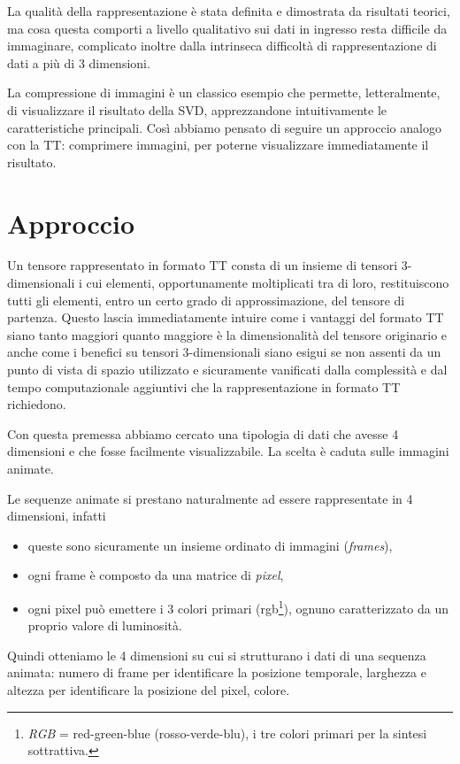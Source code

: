 \documentclass[11pt,a4paper]{article}
\begin{document}
  La qualità della rappresentazione è stata definita e dimostrata da risultati teorici, ma cosa questa comporti a livello qualitativo sui dati in ingresso resta difficile da immaginare, complicato inoltre dalla intrinseca difficoltà di rappresentazione di dati a più di 3 dimensioni.

  La compressione di immagini è un classico esempio che permette, letteralmente, di visualizzare il risultato della SVD, apprezzandone intuitivamente le caratteristiche principali. Così abbiamo pensato di seguire un approccio analogo con la TT: comprimere immagini, per poterne visualizzare immediatamente il risultato.

\section{Approccio}
Un tensore rappresentato in formato TT consta di un insieme di tensori 3-dimensionali i cui elementi, opportunamente moltiplicati tra di loro, restituiscono tutti gli elementi, entro un certo grado di approssimazione, del tensore di partenza.
Questo lascia immediatamente intuire come i vantaggi del formato TT siano tanto maggiori quanto maggiore è la dimensionalità del tensore originario e anche come i benefici su tensori 3-dimensionali siano esigui se non assenti da un punto di vista di spazio utilizzato e sicuramente vanificati dalla complessità e dal tempo computazionale aggiuntivi che la rappresentazione in formato TT richiedono.

Con questa premessa abbiamo cercato una tipologia di dati che avesse 4 dimensioni e che fosse facilmente visualizzabile. La scelta è caduta sulle immagini animate.

Le sequenze animate si prestano naturalmente ad essere rappresentate in 4 dimensioni, infatti
\begin{itemize}
\item queste sono sicuramente un insieme ordinato di immagini (\emph{frames}),
\item ogni frame è composto da una matrice di \emph{pixel},
\item ogni pixel può emettere i 3 colori primari (rgb\footnote{\emph{RGB} = red-green-blue (rosso-verde-blu), i tre colori primari per la sintesi sottrattiva.}), ognuno caratterizzato da un proprio valore di luminosità.
\end{itemize}
Quindi otteniamo le 4 dimensioni su cui si strutturano i dati di una sequenza animata: numero di frame per identificare la posizione temporale, larghezza e altezza per identificare la posizione del pixel, colore.
\end{document}
